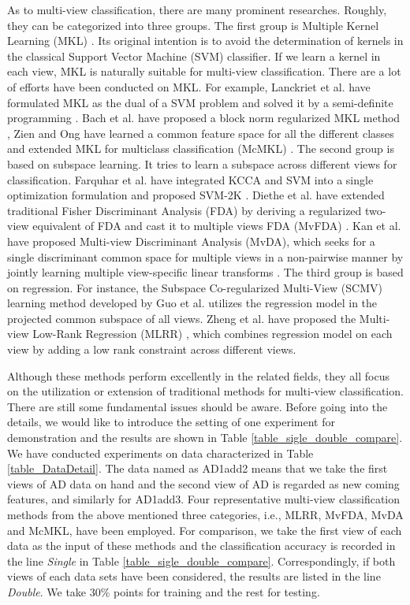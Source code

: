 \documentclass[10pt,journal,compsoc]{IEEEtran}
\begin{document}
As to multi-view classification, there are many prominent researches. Roughly, they can be categorized into three groups. The first group is Multiple Kernel Learning (MKL) \cite{jmlr/GonenA11}. Its original intention is to avoid the determination of kernels in the classical Support Vector Machine (SVM) classifier. If we learn a kernel in each view, MKL is naturally suitable for multi-view classification. There are a lot of efforts have been conducted on MKL. For example, Lanckriet et al. have formulated MKL as the dual of a SVM problem and solved it by a semi-definite programming \cite{icml/LanckrietCBGJ02}. Bach et al. have proposed a block norm regularized MKL method \cite{nips/BachTJ04}, Zien and Ong have learned a common feature space for all the different classes and extended MKL for multiclass classification (McMKL) \cite{icml/ZienO07}. The second group is based on subspace learning. It tries to learn a subspace across different views for classification. Farquhar et al. have integrated KCCA and SVM into a single optimization formulation and proposed SVM-2K \cite{nips/FarquharHMSS05}. Diethe et al. have extended traditional Fisher Discriminant Analysis (FDA) by deriving a regularized two-view equivalent of FDA and cast it to multiple views FDA (MvFDA) \cite{Diethe2008Multiview}. Kan et al. have proposed Multi-view Discriminant Analysis (MvDA), which seeks for a single discriminant common space for multiple views in a non-pairwise manner by jointly learning multiple view-specific linear transforms \cite{pami/KanSZLC16}. The third group is based on regression. For instance, the Subspace Co-regularized Multi-View (SCMV) learning method \cite{Guo2012Cross} developed by Guo et al. utilizes the regression model in the projected common subspace of all views. Zheng et al. have proposed the Multi-view Low-Rank Regression (MLRR) \cite{Zheng2015}, which combines regression model on each view by adding a low rank constraint across different views.

Although these methods perform excellently in the related fields, they all focus on the utilization or extension of traditional methods for multi-view classification. There are still some fundamental issues should be aware. Before going into the details, we would like to introduce the setting of one experiment for demonstration and the results are shown in Table \ref{table_sigle_double_compare}. We have conducted experiments on data characterized in Table \ref{table_DataDetail}. The data named as AD1add2 means that we take the first views of AD data on hand and the second view of AD is regarded as new coming features, and similarly for AD1add3. Four representative multi-view classification methods from the above mentioned three categories, i.e., MLRR, MvFDA, MvDA and McMKL, have been employed. For comparison, we take the first view of each data as the input of these methods and the classification accuracy is recorded in the line \emph{Single} in Table \ref{table_sigle_double_compare}. Correspondingly, if both views of each data sets have been considered, the results are listed in the line \emph{Double}. We take 30\% points for training and the rest for testing.
\end{document}
